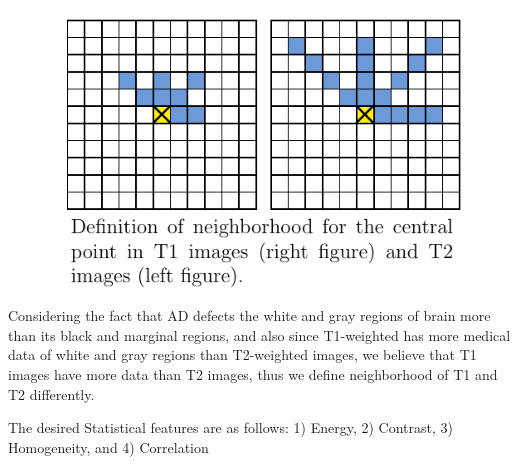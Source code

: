 \documentclass[portrait]{xebaposter}
\begin{document}
\begin{poster}
{\begin{figure}
\centering
  \vspace{-10pt}
{\includegraphics[scale=.5]{fig3}}
  \vspace{-20pt}
\label{fig3}
\end{figure}

Considering the fact that AD defects the white and gray regions of brain more than its black and marginal regions, and also since T1-weighted has more medical data of white and gray regions than T2-weighted images, we believe that T1 images have more data than T2 images, thus we define neighborhood of T1 and T2 differently.

The desired Statistical features are as follows:
1) Energy,
2) Contrast,
3) Homogeneity, and
4) Correlation


}
\end{poster}
\end{document}
